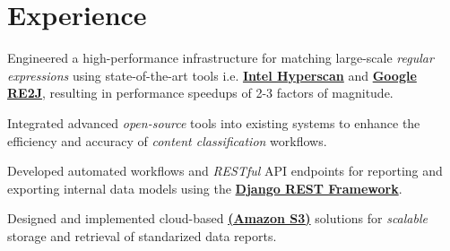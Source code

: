 \documentclass[]{openfont}
\begin{document}
\begin{minipage}[t]{0.65\textwidth}


    \section{Experience}
    \vspace{\topsep}
    \begin{tightemize}
        \item Engineered a high-performance infrastructure for matching large-scale \textit{regular expressions} using state-of-the-art tools i.e. \href{https://www.intel.com/content/www/us/en/developer/articles/technical/introduction-to-hyperscan.html}{\textbf{Intel Hyperscan}} and \href{https://github.com/google/re2j}{\textbf{Google RE2J}}, resulting in performance speedups of 2-3 factors of magnitude.
        \item Integrated advanced \textit{open-source} tools into existing systems to enhance the efficiency and accuracy of \textit{content classification} workflows.
    \end{tightemize}
    \sectionsep

    \begin{tightemize}
        \item Developed automated workflows and \textit{RESTful} API endpoints for reporting and exporting internal data models using the \textbf{\href{https://www.django-rest-framework.org/}{Django REST Framework}}.
        \item Designed and implemented cloud-based \href{https://aws.amazon.com/s3/}{\textbf{(Amazon S3)}} solutions for \textit{scalable} storage and retrieval of standarized data reports.
    \end{tightemize}
    \sectionsep


\end{minipage}
\end{document}
